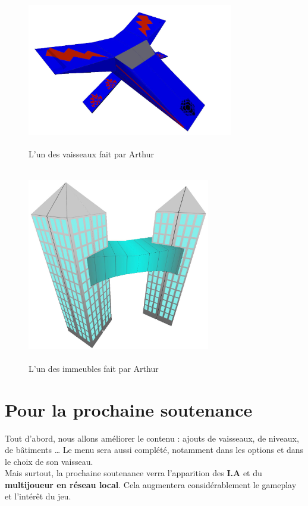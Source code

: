 \documentclass[10pt, titlepage]{report}
\begin{document}
\begin{figure}
\center
\includegraphics[height=6cm, width=9cm]{vaisseau_arthur.jpg}
\caption{L'un des vaisseaux fait par Arthur}

\includegraphics[height=8.5cm, width=8cm]{batiment_arthur.jpg}
\caption{L'un des immeubles fait par Arthur}

\end{figure}

\chapter{Pour la prochaine soutenance}

Tout d'abord, nous allons améliorer le contenu : ajouts de vaisseaux, de niveaux, de bâtiments \dots
Le menu sera aussi complété, notamment dans les options et dans le choix de son vaisseau.\\

Mais surtout, la prochaine soutenance verra l'apparition des \textbf{I.A} et du \textbf{multijoueur en réseau local}. Cela augmentera considérablement le gameplay et l'intérêt du jeu.
\end{document}
